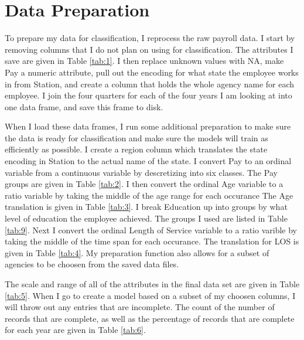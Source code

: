 \documentclass{article}
\begin{document}
\section{Data Preparation}
To prepare my data for classification, I reprocess the raw payroll data. I start by removing columns that I do not plan on using for classification. The attributes I save are given in Table \ref{tab:1}. I then replace unknown values with NA, make Pay a numeric attribute, pull out the encoding for what state the employee works in from Station, and create a column that holds the whole agency name for each employee. I join the four quarters for each of the four years I am looking at into one data frame, and save this frame to disk.
\par
When I load these data frames, I run some additional preparation to make sure the data is ready for classification and make sure the models will train as efficiently as possible. I create a region column which translates the state encoding in Station to the actual name of the state. I convert Pay to an ordinal variable from a continuous variable by descretizing into six classes. The Pay groups are given in Table \ref{tab:2}. I then convert the ordinal Age variable to a ratio variable by taking the middle of the age range for each occurance The Age translation is given in Table \ref{tab:3}. I break Education up into groups by what level of education the employee achieved. The groups I used are listed in Table \ref{tab:9}. Next I convert the ordinal Length of Service variable to a ratio varible by taking the middle of the time span for each occurance. The translation for LOS is given in Table \ref{tab:4}. My preparation function also allows for a subset of agencies to be choosen from the saved data files.
\par
The scale and range of all of the attributes in the final data set are given in Table \ref{tab:5}. When I go to create a model based on a subset of my choosen columns, I will throw out any entries that are incomplete. The count of the number of records that are complete, as well as the percentage of records that are complete for each year are given in Table \ref{tab:6}.
\end{document}
